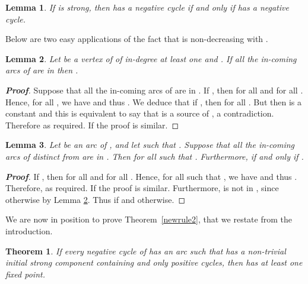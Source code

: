\documentclass[11pt,a4paper]{article}
\newtheorem{lemma}{Lemma}
\newtheorem{theorem}{Theorem}
\begin{document}
\begin{lemma}\label{lem_GG*}
If  is strong, then  has a negative cycle if and only if  has a negative cycle.
\end{lemma}

Below are two easy applications of the fact that  is non-decreasing with .

\begin{lemma}\label{lem_ex_1}
Let  be a vertex of  of in-degree at least one and . If all the in-coming arcs of  are in  then . 
\end{lemma}


\begin{proof}[{\bf Proof}]
Suppose that all the in-coming arcs of  are in . If , then  for all  and  for all . Hence, for all , we have  and thus . We deduce that if , then  for all . But then  is a constant and this is equivalent to say that  is a source of , a contradiction. Therefore  as required. If  the proof is similar. 
\end{proof}

\begin{lemma}\label{lem_ex_2}
Let  be an arc of , and let  such that . Suppose that all the in-coming arcs of  distinct from  are in . Then  for all  such that . Furthermore,  if and only if . 
\end{lemma}


\begin{proof}[{\bf Proof}]
If , then  for all  and  for all . Hence, for all  such that , we have  and thus . Therefore,  as required. If  the proof is similar. Furthermore,  is not in , since otherwise  by Lemma \ref{lem_ex_1}. Thus  if  and  otherwise. 
\end{proof}

We are now in position to prove Theorem~\ref{newrule2}, that we restate from the introduction. 

\setcounter{theorem}{4}

\begin{theorem}
If every negative cycle of  has an arc  such that  has a non-trivial initial strong component containing  and only positive cycles, then  has at least one fixed point.
\end{theorem}
\end{document}
